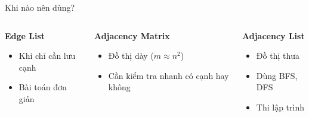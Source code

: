 \documentclass{beamer}
\begin{document}
\begin{frame}{Khi nào nên dùng?}

\begin{columns}


\begin{tcolorbox}
\textbf{\faLightbulb Edge List}
\begin{itemize}
\item Khi chỉ cần lưu cạnh
\item Bài toán đơn giản
\end{itemize}
\end{tcolorbox}

\vspace{0.2cm}

\begin{tcolorbox}
\textbf{\faLightbulb Adjacency Matrix}
\begin{itemize}
\item Đồ thị dày ($m \approx n^2$)
\item Cần kiểm tra nhanh có cạnh hay không
\end{itemize}
\end{tcolorbox}


\begin{tcolorbox}
\textbf{\faLightbulb Adjacency List}
\begin{itemize}
\item Đồ thị thưa
\item Dùng BFS, DFS
\item Thi lập trình
\end{itemize}
\end{tcolorbox}

\end{columns}

\end{frame}
\end{document}
